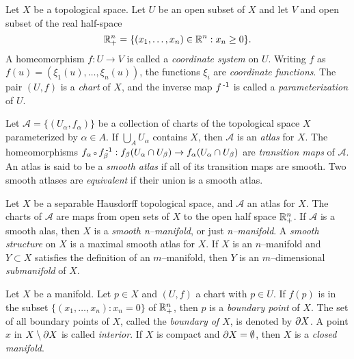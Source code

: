 \begin{defn}[Coordinates]
	\label{def:coordinates}
	Let $X$ be a topological space.
	Let $U$ be an open subset of $X$ and let $V$ and open subset of the real half-space
	$$\mathbb{R}_+^n=\{(x_1,\dots,x_{n})\in\mathbb{R}^n : x_n\geq 0\}.$$
	A homeomorphism $f:U\to V$ is called a \emph{coordinate system} on $U$.
	Writing $f$ as $f(u)=(\xi_1(u),\dots,\xi_n(u))$, the functions $\xi_i$ are \emph{coordinate functions}.
	The pair $(U,f)$ is a \emph{chart} of $X$, and the inverse map $f^{\,\text{-}1}$ is called a \emph{parameterization} of $U$.
\end{defn}

\begin{defn}[Atlas]
	\label{def:atlas}
	Let $\mathcal{A}=\{(U_\alpha,f_\alpha)\}$ be a collection of charts of the topological space $X$ parameterized by $\alpha\in A$.
	If $\bigcup_A U_\alpha$ contains $X$, then $\mathcal{A}$ is an \emph{atlas} for $X$.
	The homeomorphisms $f_\alpha\comp f_\beta\inv:f_\beta(U_\alpha\cap U_\beta)\to f_\alpha(U_\alpha\cap U_\beta)$ are \emph{transition maps} of $\mathcal{A}$.
	An atlas is said to be a \emph{smooth atlas} if all of its transition maps are smooth.
	Two smooth atlases are \emph{equivalent} if their union is a smooth atlas.
\end{defn}

\begin{defn}[Manifolds]
	\label{def:manifold}
	Let $X$ be a separable Hausdorff topological space, and $\mathcal{A}$ an atlas for $X$.
	The charts of $\mathcal{A}$ are maps from open sets of $X$ to the open half space $\mathbb{R}_+^n$.
	If $\mathcal{A}$ is a smooth alas, then $X$ is a \emph{smooth n--manifold}, or just \emph{n--manifold}.
	A \emph{smooth structure} on $X$ is a maximal smooth atlas for $X$.
	If $X$ is an $n$--manifold and $Y\subset X$ satisfies the definition of an $m$--manifold, then $Y$ is an $m$--dimensional \emph{submanifold} of $X$.
\end{defn}

\begin{defn}	
	\label{def:boundary}
	Let $X$ be a manifold.
	Let $p\in X$ and $(U,f)$ a chart with $p\in U$.
	If $f(p)$ is in the subset $\{(x_1,\dots,x_n): x_n = 0\}$ of $\mathbb{R}_+^n$, then $p$ is a \emph{boundary point} of $X$.
	The set of all boundary points of $X$, called the \emph{boundary of $X$}, is denoted by $\partial X$.
	A point $x$ in $X\setminus \partial X$ is called \emph{interior}.
	If $X$ is compact and $\partial X=\emptyset$, then $X$ is a \emph{closed manifold}.
\end{defn}

